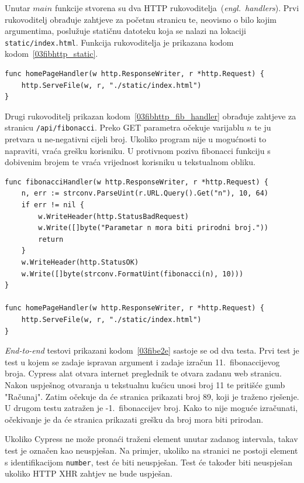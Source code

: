Unutar $main$ funkcije stvorena su dva HTTP rukovoditelja~(\textit{engl.~handlers}). Prvi
rukovoditelj obrađuje zahtjeve za početnu stranicu te, neovisno o bilo kojim argumentima, poslužuje
statičnu datoteku koja se nalazi na lokaciji \texttt{static/index.html}. Funkcija rukovoditelja je
prikazana kodom kodom~\ref{03fibhttp_static}.
\begin{lstlisting}[float=h]
func homePageHandler(w http.ResponseWriter, r *http.Request) {
	http.ServeFile(w, r, "./static/index.html")
}
\end{lstlisting}

Drugi rukovoditelj prikazan kodom~\ref{03fibhttp_fib_handler} obrađuje zahtjeve za stranicu
\texttt{/api/fibonacci}. Preko GET parametra očekuje varijablu $n$ te ju pretvara u ne-negativni
cijeli broj. Ukoliko program nije u mogućnosti to napraviti, vraća grešku korisniku. U protivnom
poziva fibonacci funkciju s dobivenim brojem te vraća vrijednost korisniku u tekstualnom obliku.

\begin{lstlisting}[float=h]
func fibonacciHandler(w http.ResponseWriter, r *http.Request) {
	n, err := strconv.ParseUint(r.URL.Query().Get("n"), 10, 64)
	if err != nil {
		w.WriteHeader(http.StatusBadRequest)
		w.Write([]byte("Parametar n mora biti prirodni broj."))
		return
	}
	w.WriteHeader(http.StatusOK)
	w.Write([]byte(strconv.FormatUint(fibonacci(n), 10)))
}

func homePageHandler(w http.ResponseWriter, r *http.Request) {
	http.ServeFile(w, r, "./static/index.html")
}
\end{lstlisting}

\textit{End-to-end} testovi prikazani kodom~\ref{03fibe2e} sastoje se od dva testa. Prvi test je
test u kojem se zadaje ispravan argument i zadaje izračun 11.~fibonaccijevog broja. Cypress alat
otvara internet preglednik te otvara zadanu web stranicu. Nakon uspješnog otvaranja u tekstualnu
kućicu unosi broj 11 te pritišće gumb "Računaj". Zatim očekuje da će stranica prikazati broj 89,
koji je traženo rješenje. U drugom testu zatražen je -1.~fibonaccijev broj. Kako to nije moguće
izračunati, očekivanje je da će stranica prikazati grešku da broj mora biti prirodan.

Ukoliko Cypress ne može pronaći traženi element unutar zadanog intervala, takav test je označen kao
neuspješan. Na primjer, ukoliko na stranici ne postoji element s identifikacijom \texttt{number},
test će biti neuspješan. Test će također biti neuspješan ukoliko HTTP XHR zahtjev ne bude uspješan.

